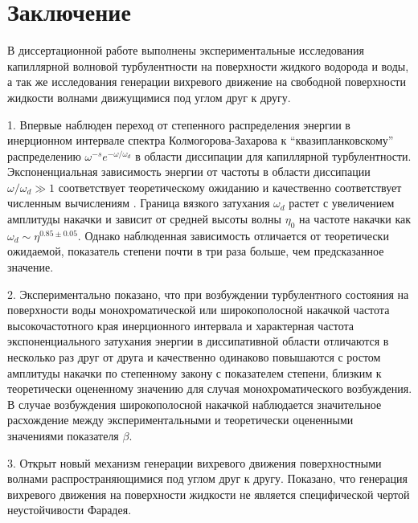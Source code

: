 \chapter*{Заключение}						%

В диссертационной работе выполнены экспериментальные исследования капиллярной волновой турбулентности на поверхности жидкого водорода и воды, а так же исследования генерации вихревого движение на свободной поверхности жидкости волнами движущимися под углом друг к другу.

1. Впервые наблюден переход от степенного распределения энергии в инерционном интервале спектра Колмогорова-Захарова к “квазипланковскому” распределению $\omega^{-s}e^{-\omega/\omega_d}$ в области диссипации для капиллярной турбулентности. Экспоненциальная зависимость энергии от частоты в области диссипации $\omega/\omega_d \gg 1$ соответствует теоретическому ожиданию и качественно соответствует численным вычислениям \cite{Ryzhenkova1990}. Граница вязкого затухания $\omega_d$ растет с увеличением амплитуды накачки и зависит от средней высоты волны $\eta_0$ на частоте накачки как $\omega_d \sim \eta^{0.85 \pm 0.05}$. Однако наблюденная зависимость отличается от теоретически ожидаемой, показатель степени почти в три раза больше, чем предсказанное значение.

2. Экспериментально показано, что при возбуждении турбулентного состояния на поверхности воды монохроматической или широкополосной накачкой частота высокочастотного края инерционного интервала и характерная частота экспоненциального затухания энергии в диссипативной области отличаются в несколько раз друг от друга и качественно одинаково повышаются с ростом амплитуды накачки по степенному закону с показателем степени, близким к теоретически оцененному значению для случая монохроматического возбуждения. В случае возбуждения широкополосной накачкой наблюдается значительное расхождение между экспериментальными и теоретически оцененными значениями показателя $\beta$.

3. Открыт новый механизм генерации вихревого движения поверхностными волнами распространяющимися под углом друг к другу. Показано, что генерация вихревого движения на поверхности жидкости не является специфической чертой неустойчивости Фарадея.

